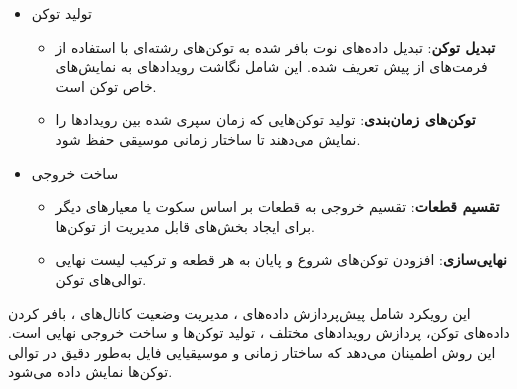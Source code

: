 \begin{itemize}
      \item    {تولید توکن}

            \begin{itemize}

                  \item
                        \textbf{تبدیل توکن}: تبدیل داده‌های نوت بافر شده به توکن‌های رشته‌ای با
                        استفاده از فرمت‌های از پیش تعریف شده. این شامل نگاشت رویدادهای  به
                        نمایش‌های خاص توکن است.
                  \item
                        \textbf{توکن‌های زمان‌بندی}: تولید توکن‌هایی که زمان سپری شده بین
                        رویدادها را نمایش می‌دهند تا ساختار زمانی موسیقی حفظ شود.
            \end{itemize}

      \item{ساخت خروجی}

            \begin{itemize}

                  \item
                        \textbf{تقسیم قطعات}: تقسیم خروجی به قطعات بر اساس سکوت یا معیارهای
                        دیگر برای ایجاد بخش‌های قابل مدیریت از توکن‌ها.
                  \item
                        \textbf{نهایی‌سازی}: افزودن توکن‌های شروع و پایان به هر قطعه و ترکیب
                        لیست نهایی توالی‌های توکن.
            \end{itemize}

\end{itemize}

این رویکرد شامل پیش‌پردازش داده‌های ، مدیریت وضعیت کانال‌های ، بافر
کردن داده‌های توکن، پردازش رویدادهای مختلف ، تولید توکن‌ها و ساخت
خروجی نهایی است. این روش اطمینان می‌دهد که ساختار زمانی و موسیقیایی فایل
 به‌طور دقیق در توالی توکن‌ها نمایش داده می‌شود.

